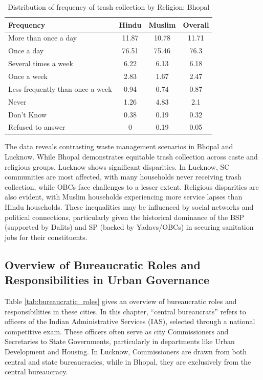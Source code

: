 \begin{table}[ht]
\centering
\caption{Distribution of frequency of trash collection by Religion: Bhopal}
\label{tab:trash_religion_bhopal}
\begin{tabular}{|l|c|c|c|}
\hline
\textbf{Frequency} & \textbf{Hindu} & \textbf{Muslim} & \textbf{Overall} \\
\hline
More than once a day & 11.87 & 10.78 & 11.71 \\
\hline
Once a day & 76.51 & 75.46 & 76.3 \\
\hline
Several times a week & 6.22 & 6.13 & 6.18 \\
\hline
Once a week & 2.83 & 1.67 & 2.47 \\
\hline
Less frequently than once a week & 0.94 & 0.74 & 0.87 \\
\hline
Never & 1.26 & 4.83 & 2.1 \\
\hline
Don't Know & 0.38 & 0.19 & 0.32 \\
\hline
Refused to answer & 0 & 0.19 & 0.05 \\
\hline
\end{tabular}
\end{table}

The data reveals contrasting waste management scenarios in Bhopal and Lucknow. While Bhopal demonstrates equitable trash collection across caste and religious groups, Lucknow shows significant disparities. In Lucknow, SC communities are most affected, with many households never receiving trash collection, while OBCs face challenges to a lesser extent. Religious disparities are also evident, with Muslim households experiencing more service lapses than Hindu households. These inequalities may be influenced by social networks and political connections, particularly given the historical dominance of the BSP (supported by Dalits) and SP (backed by Yadavs/OBCs) in securing sanitation jobs for their constituents.

\subsection{Overview of Bureaucratic Roles and Responsibilities in Urban Governance}

Table \ref{tab:bureaucratic_roles} gives an overview of bureaucratic roles and responsibilities in these cities. In this chapter, ``central bureaucrats'' refers to officers of the Indian Administrative Services (IAS), selected through a national competitive exam. These officers often serve as city Commissioners and Secretaries to State Governments, particularly in departments like Urban Development and Housing. In Lucknow, Commissioners are drawn from both central and state bureaucracies, while in Bhopal, they are exclusively from the central bureaucracy.

